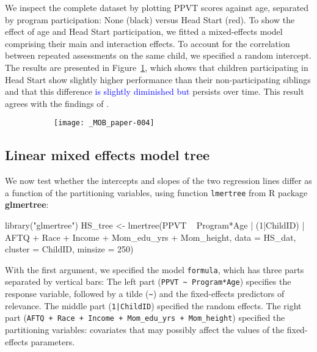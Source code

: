 \documentclass[doc,floatsintext,natbib]{apa7}
\newcommand{\edc}[1]{\textcolor{blue}{#1}}
\begin{document}
We inspect the complete dataset by plotting PPVT scores against age, separated by program participation: None (black) versus Head Start (red). To show the effect of age and Head Start participation, we fitted a mixed-effects model comprising their main and interaction effects. To account for the correlation between repeated assessments on the same child, we specified a random intercept. The results are presented in Figure~\ref{fig:global_lmm}, which shows that children participating in Head Start show slightly higher performance than their non-participating siblings and that this difference \edc{is slightly diminished but} persists over time. This result agrees with the findings of \cite{Demi09}.

\begin{figure}%
\caption{}
\begin{subfigure}{.7\textwidth}
\texttt{[image: \_MOB\_paper-004]}
\end{subfigure}
\label{fig:global_lmm}
\end{figure}%


\FloatBarrier
\subsection{Linear mixed effects model tree}

We now test whether the intercepts and slopes of the two regression lines differ as a function of the partitioning variables, using function \verb|lmertree| from R package \textbf{glmertree}:

\begin{Schunk}
\begin{Sinput}
 library("glmertree")
 HS_tree <- lmertree(PPVT ~ Program*Age | (1|ChildID) | AFTQ + Race + 
                       Income + Mom_edu_yrs + Mom_height, 
                     data = HS_dat, cluster = ChildID, minsize = 250)
\end{Sinput}
\end{Schunk}

With the first argument, we specified the model \verb|formula|, which has three parts separated by vertical bars: The left part (\verb|PPVT ~ Program*Age|) specifies the response variable, followed by a tilde (\verb|~|) and the fixed-effects predictors of relevance. The middle part (\texttt{1|ChildID}) specified the random effects. The right part (\verb|AFTQ + Race + Income + Mom_edu_yrs + Mom_height|) specified the partitioning variables: covariates that may possibly affect the values of the fixed-effects parameters. 
\end{document}
